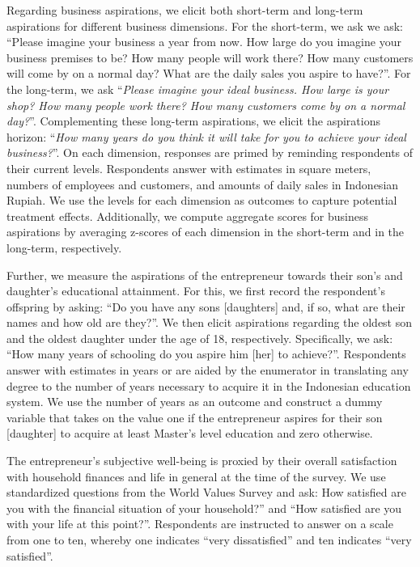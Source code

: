\documentclass[11.5pt]{article}
\begin{document}
Regarding business aspirations, we elicit both short-term and long-term aspirations for different business dimensions. For the short-term, we ask we ask: ``Please imagine your business a year from now. How large do you imagine your business premises to be? How many people will work there? How many customers will come by on a normal day? What are the daily sales you aspire to have?''. For the long-term, we ask ``\emph{Please imagine your ideal business. How large is your shop? How many people work there? How many customers come by on a normal day?}''. Complementing these long-term aspirations, we elicit the aspirations horizon: ``\emph{How many years do you think it will take for you to achieve your ideal business?}''. On each dimension, responses are primed by reminding respondents of their current levels. Respondents answer with estimates in square meters, numbers of employees and customers, and amounts of daily sales in Indonesian Rupiah. We use the levels for each dimension as outcomes to capture potential treatment effects. Additionally, we compute aggregate scores for business aspirations by averaging z-scores of each dimension in the short-term and in the long-term, respectively.

Further, we measure the aspirations of the entrepreneur towards their son's and daughter's educational attainment. For this, we first record the respondent's offspring by asking: ``Do you have any sons [daughters] and, if so, what are their names and how old are they?''. We then elicit aspirations regarding the oldest son and the oldest daughter under the age of 18, respectively. Specifically, we ask: ``How many years of schooling do you aspire him [her] to achieve?''. Respondents answer with estimates in years or are aided by the enumerator in translating any degree to the number of years necessary to acquire it in the Indonesian education system. We use the number of years as an outcome and construct a dummy variable that takes on the value one if the entrepreneur aspires for their son [daughter] to acquire at least Master's level education and zero otherwise.

The entrepreneur's subjective well-being is proxied by their overall satisfaction with household finances and life in general at the time of the survey. We use standardized questions from the World Values Survey and ask: How satisfied are you with the financial situation of your household?'' and ``How satisfied are you with your life at this point?''. Respondents are instructed to answer on a scale from one to ten, whereby one indicates ``very dissatisfied'' and ten indicates ``very satisfied''.
\end{document}
